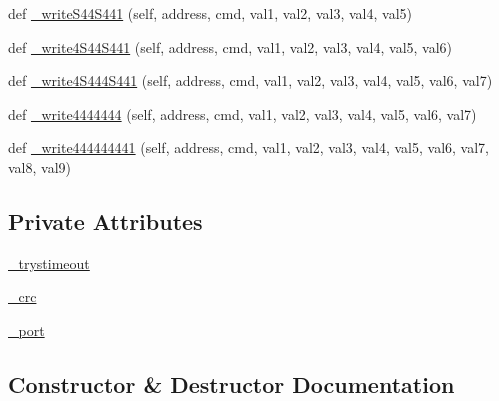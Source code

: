 \begin{DoxyCompactItemize}
\item 
def \mbox{\hyperlink{classtoxic__hardware_1_1roboclaw__3_1_1Roboclaw_a960511b0293744d9f64a79f38d944a60}{\+\_\+write\+S44\+S441}} (self, address, cmd, val1, val2, val3, val4, val5)
\item 
def \mbox{\hyperlink{classtoxic__hardware_1_1roboclaw__3_1_1Roboclaw_a9e7a5eedc686f4e157db9c01b9b09371}{\+\_\+write4\+S44\+S441}} (self, address, cmd, val1, val2, val3, val4, val5, val6)
\item 
def \mbox{\hyperlink{classtoxic__hardware_1_1roboclaw__3_1_1Roboclaw_ab245d118d96ac56d918b3e9a76315aac}{\+\_\+write4\+S444\+S441}} (self, address, cmd, val1, val2, val3, val4, val5, val6, val7)
\item 
def \mbox{\hyperlink{classtoxic__hardware_1_1roboclaw__3_1_1Roboclaw_aa81bec5ecefa606fbf18f4549051f6aa}{\+\_\+write4444444}} (self, address, cmd, val1, val2, val3, val4, val5, val6, val7)
\item 
def \mbox{\hyperlink{classtoxic__hardware_1_1roboclaw__3_1_1Roboclaw_addae6fb16d10ba717d3863227aa9eb16}{\+\_\+write444444441}} (self, address, cmd, val1, val2, val3, val4, val5, val6, val7, val8, val9)
\end{DoxyCompactItemize}
\subsection*{Private Attributes}
\begin{DoxyCompactItemize}
\item 
\mbox{\hyperlink{classtoxic__hardware_1_1roboclaw__3_1_1Roboclaw_a968cac0c8e9cc6a07cba51e294251240}{\+\_\+trystimeout}}
\item 
\mbox{\hyperlink{classtoxic__hardware_1_1roboclaw__3_1_1Roboclaw_a23587ce1375b80348b7931530929ce09}{\+\_\+crc}}
\item 
\mbox{\hyperlink{classtoxic__hardware_1_1roboclaw__3_1_1Roboclaw_a4baa700b692cd73d8441df1046fdc239}{\+\_\+port}}
\end{DoxyCompactItemize}


\subsection{Constructor \& Destructor Documentation}
\mbox{\label{classtoxic__hardware_1_1roboclaw__3_1_1Roboclaw_a0f9f3612daa4ca7ffa720a9d3b4b3417}} 
